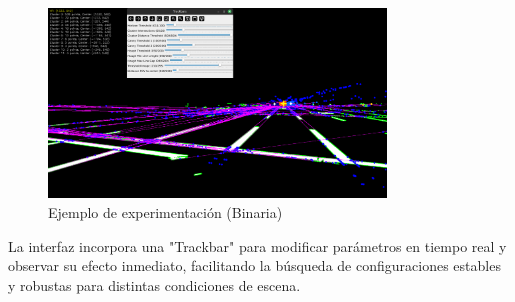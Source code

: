 \begin{figure}[!ht]
	
		\includegraphics[width=0.8\textwidth]{img/reticule/experimentationBinary}
		\caption{Ejemplo de experimentación (Binaria)}
		\label{fig:experimentationBinary-teo}
	
\end{figure}

\noindent
La interfaz incorpora una "Trackbar" para modificar parámetros en tiempo real y observar su efecto inmediato,
facilitando la búsqueda de configuraciones estables y robustas para distintas condiciones de escena.
